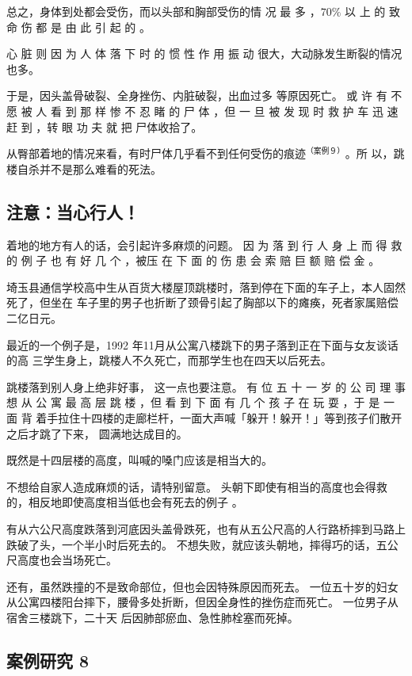 \documentclass[UTF8]{ctexart}
\begin{document}
总之，身体到处都会受伤，而以头部和胸部受伤的情 况 最 多 ，$70\%$ 以 上 的 致 命 伤 都 是 由 此 引 起 的 。

心 脏 则 因 为 人 体 落 下 时 的 惯 性 作 用 振 动 很大，大动脉发生断裂的情况也多。

于是，因头盖骨破裂、全身挫伤、内脏破裂，出血过多 等原因死亡。 
或 许 有 不 愿 被 人 看 到 那 样 惨 不 忍 睹 的 尸 体 ，但 一 旦 被 发 现 时 救 护 车 迅 速 赶 到 ，转 眼 功 夫 就 把 尸体收拾了。

从臀部着地的情况来看，有时尸体几乎看不到任何受伤的痕迹$^{（案例９）}$。所 以，跳楼自杀并不是那么难看的死法。

\subsection{注意：当心行人！}

着地的地方有人的话，会引起许多麻烦的问题。 因 为 落 到 行 人 身 上 而 得 救 的 例 子 也 有 好 几 个 ，被压 在 下 面 的 伤 患 会 索 赔 巨 额 赔 偿 金 。

埼玉县通信学校高中生从百货大楼屋顶跳楼时，落到停在下面的车子上，本人固然死了，但坐在 车子里的男子也折断了颈骨引起了胸部以下的瘫痪，死者家属赔偿二亿日元。

最近的一个例子是，1992 年11月从公寓八楼跳下的男子落到正在下面与女友谈话的高 三学生身上，跳楼人不久死亡，而那学生也在四天以后死去。

跳楼落到别人身上绝非好事， 这一点也要注意。 有 位 五 十 一 岁 的 公 司 理 事 想 从 公 寓 最 高 层 跳 楼 ，但 看 到 下 面 有 几 个 孩 子 在 玩 耍 ，于 是 一 面 背 着手拉住十四楼的走廊栏杆，一面大声喊「躲开！躲开！」等到孩子们散开之后才跳了下来， 圆满地达成目的。

既然是十四层楼的高度，叫喊的嗓门应该是相当大的。

不想给自家人造成麻烦的话，请特别留意。 
头朝下即使有相当的高度也会得救的，相反地即使高度相当低也会有死去的例子 。

有从六公尺高度跌落到河底因头盖骨跌死，也有从五公尺高的人行路桥摔到马路上跌破了头，一个半小时后死去的。
不想失败，就应该头朝地，摔得巧的话，五公尺高度也会当场死亡。

还有，虽然跌撞的不是致命部位，但也会因特殊原因而死去。
一位五十岁的妇女从公寓四楼阳台摔下，腰骨多处折断，但因全身性的挫伤症而死亡。
一位男子从宿舍三楼跳下，二十天 后因肺部瘀血、急性肺栓塞而死掉。

\subsection{案例研究 8}
\end{document}
